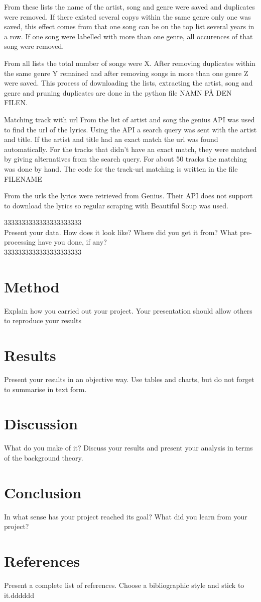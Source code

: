 \documentclass[a4paper, 12pt]{article}
\begin{document}
From these lists the name of the artist, song and genre were saved and duplicates were removed.
If there existed several copys within the same genre only one was saved, this effect comes from that one song can be on the top list several years in a row. If one song were labelled with more than one genre, all occurences of that song were removed.

From all lists the total number of songs were X.
After removing duplicates within the same genre Y remained and after removing songs in more than one genre Z were saved.
This process of downloading the lists, extracting the artist, song and genre and pruning duplicates are done in the python file {NAMN PÅ DEN FILEN}.

Matching track with url
From the list of artist and song the genius API was used to find the url of the lyrics.
Using the API a search query was sent with the artist and title.
If the artist and title had an exact match the url was found automatically.
For the tracks that didn't have an exact match, they were matched by giving alternatives from the search query.
For about 50 tracks the matching was done by hand.
The code for the track-url matching is written in the file {FILENAME} 

From the urls the lyrics were retrieved from Genius.
Their API does not support to download the lyrics so regular scraping with Beautiful Soup was used.

3333333333333333333333 \\
Present your data. How does it look like? Where did you get
it from? What pre-processing have you done, if any? \\
3333333333333333333333 \\
\section{Method}
Explain how you carried out your project. Your
presentation should allow others to reproduce your results

\section{Results}
Present your results in an objective way. Use tables and
charts, but do not forget to summarise in text form.
\section{Discussion}
What do you make of it? Discuss your results and
present your analysis in terms of the background theory. \cite{Tsaptsinos2017}
\section{Conclusion}
In what sense has your project reached its goal? What
did you learn from your project?
\cite{Canicatti}
\section*{References}
Present a complete list of references. Choose a
bibliographic style and stick to it.dddddd




\end{document}

